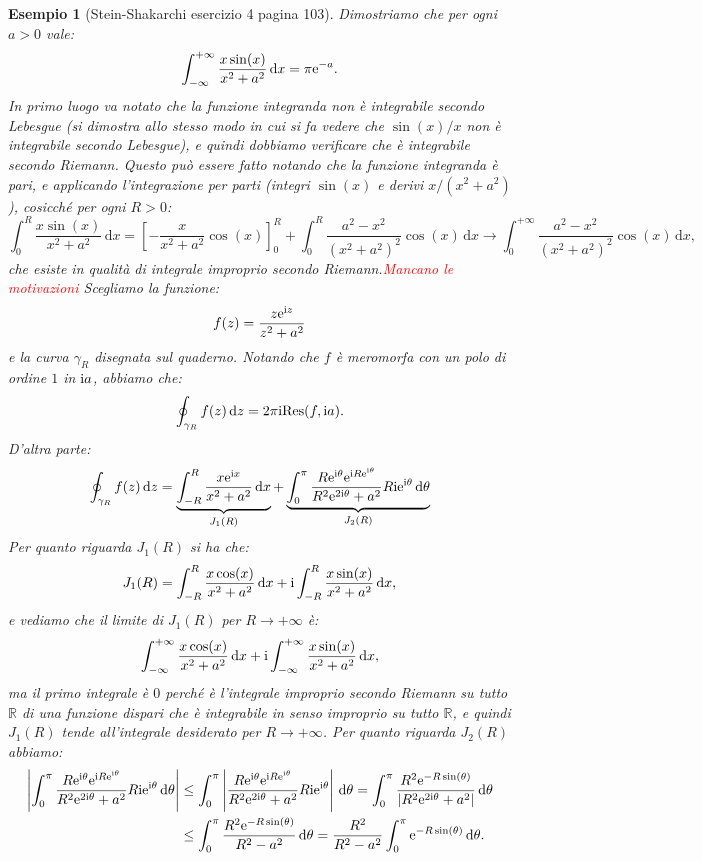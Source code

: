 \documentclass[11pt]{book}
\theoremstyle{Definizione}
\theoremstyle{TeoremaProposizioneLemmaCorollarioCongettura}
\theoremstyle{OsservazioneNotaEsempio}
\newtheorem{myes}{Esempio}[section]
\newcommand{\R}{\mathbb{R}}
\renewcommand{\i}{\textup{i}}
\newcommand{\e}{\textup{e}}
\renewcommand{\d}{\mathrm{d}}
\newcommand{\dz}{\,\d z}
\newcommand{\dx}{\,\d x}
\newcommand{\dtheta}{\, \d \theta}
\newcommand{\Res}{\textup{Res}}
\begin{document}
\begin{myes}[Stein-Shakarchi esercizio 4 pagina 103]\label{es:SteinShakarchiEs4pag103}
Dimostriamo che per ogni $a > 0$ vale:
$$
\int_{-\infty}^{+\infty} \frac{x \sin(x)}{x^2+a^2}\dx = \pi \e^{-a}.
$$
In primo luogo va notato che la funzione integranda non è integrabile secondo Lebesgue (si dimostra allo stesso modo in cui si fa vedere che $\sin(x)/x$ non è integrabile secondo Lebesgue), e quindi dobbiamo verificare che è integrabile secondo Riemann. Questo può essere fatto notando che la funzione integranda è pari, e applicando l'integrazione per parti (integri $\sin(x)$ e derivi $x/(x^2+a^2)$), cosicché per ogni $R > 0$:
$$
\int_0^R \frac{x\sin(x)}{x^2+a^2} \dx = \left[-\frac{x}{x^2+a^2}\cos(x)\right]_0^R + \int_{0}^{R} \frac{a^2-x^2}{(x^2+a^2)^2}\cos(x) \dx \to \int_{0}^{+\infty} \frac{a^2-x^2}{(x^2+a^2)^2}\cos(x) \dx,
$$
che esiste in qualità di integrale improprio secondo Riemann.\textcolor{red}{Mancano le motivazioni} Scegliamo la funzione:
$$
f(z) = \frac{z\e^{\i z}}{z^2+a^2}
$$
e la curva $\gamma_R$ disegnata sul quaderno. Notando che $f$ è meromorfa con un polo di ordine $1$ in $\i a$, abbiamo che:
$$
\oint_{\gamma_R} f(z) \dz = 2\pi\i \Res(f,\i a).
$$
D'altra parte:
$$
\oint_{\gamma_R} f(z)\dz = \underbrace{\int_{-R}^{R} \frac{x \e^{\i x}}{x^2+a^2}\dx}_{J_1(R)} + \underbrace{\int_0^{\pi} \frac{R \e^{\i\theta} \e^{\i R\e^{\i\theta}}}{R^2\e^{2\i\theta}+a^2}R\i\e^{\i\theta}\dtheta}_{J_2(R)}
$$
Per quanto riguarda $J_1(R)$ si ha che:
$$
J_1(R) = \int_{-R}^{R} \frac{x\cos(x)}{x^2+a^2}\dx + \i \int_{-R}^{R} \frac{x\sin(x)}{x^2+a^2}\dx,
$$
e vediamo che il limite di $J_1(R)$ per $R \to +\infty$ è:
$$
\int_{-\infty}^{+\infty} \frac{x\cos(x)}{x^2+a^2}\dx + \i \int_{-\infty}^{+\infty} \frac{x\sin(x)}{x^2+a^2}\dx,
$$
ma il primo integrale è $0$ perché è l'integrale improprio secondo Riemann su tutto $\R$ di una funzione dispari che è integrabile in senso improprio su tutto $\R$, e quindi $J_1(R)$ tende all'integrale desiderato per $R \to +\infty$. Per quanto riguarda $J_2(R)$ abbiamo:
\begin{align*}
\left|\int_0^{\pi} \frac{R \e^{\i\theta} \e^{\i R\e^{\i\theta}}}{R^2\e^{2\i\theta}+a^2}R\i\e^{\i\theta}\dtheta\right| &\leq \int_0^{\pi} \left|\frac{R \e^{\i\theta} \e^{\i R\e^{\i\theta}}}{R^2\e^{2\i\theta}+a^2}R\i\e^{\i\theta}\right|\dtheta = \int_0^{\pi} \frac{R^2\e^{-R\sin(\theta)}}{|R^2\e^{2\i\theta}+a^2|}\dtheta\\
&\leq \int_0^\pi\frac{R^2\e^{-R\sin(\theta)}}{R^2-a^2}\dtheta = \frac{R^2}{R^2-a^2}\int_0^{\pi} \e^{-R\sin(\theta)}\dtheta.
\end{align*}

\end{myes}
\end{document}
